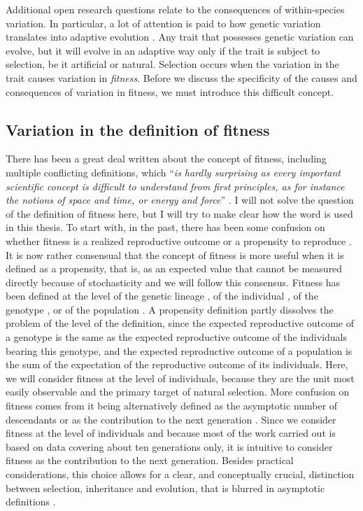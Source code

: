 Additional open research questions relate to the consequences of within-species variation. In particular, a lot of attention is paid to how genetic variation translates into adaptive evolution \parencite{Brookfield2016}.
Any trait that possesses genetic variation can evolve, but it will evolve in an adaptive way only if the trait is subject to selection, be it artificial or natural. Selection occurs when the variation in the trait causes variation in \emph{fitness}. Before we discuss the specificity of the causes and consequences of variation in fitness, we must introduce this difficult concept.

\subsection{Variation in the definition of fitness}
There has been a great deal written about the concept of fitness, including multiple conflicting definitions, which ``\emph{is hardly surprising as every important scientific concept is difficult to understand from first principles, as for instance the notions of space and time, or energy and force}'' \parencite[p. 1358][]{Wagner2010}. I will not solve the question of the definition of fitness here, but I will try to make clear how the word is used in this thesis. To start with, in the past, there has been some confusion on whether fitness is a realized reproductive outcome or a propensity to reproduce \parencite{Brandon1984}. It is now rather consensual that the concept of fitness is more useful when it is defined as a propensity, that is, as an expected value that cannot be measured directly because of stochasticity \parencite{Brandon1984,Price1996,Krimbas2004} and we will follow this consensus. Fitness has been defined at the level of the genetic lineage \parencite[e.g.][]{Akc2016}, of the individual \parencite[e.g.][]{Cam2000}, of the genotype \parencite[e.g.][]{Steiner2012}, or of the population \parencite[e.g.][]{vanTienderen2000}. A propensity definition partly dissolves the problem of the level of the definition, since the expected reproductive outcome of a genotype is the same as the expected reproductive outcome of the individuals bearing this genotype, and the expected reproductive outcome of a population is the sum of the expectation of the reproductive outcome of its individuals. Here, we will consider fitness at the level of individuals, because they are the unit most easily observable and the primary target of natural selection.
More confusion on fitness comes from it being alternatively defined as the asymptotic number of descendants or as the contribution to the next generation \parencite{Wade2006}. Since we consider fitness at the level of individuals and because most of the work carried out is based on data covering about ten generations only, it is intuitive to consider fitness as the contribution to the next generation. Besides practical considerations, this choice allows for a clear, and conceptually crucial, distinction between selection, inheritance and evolution, that is blurred in asymptotic definitions \parencite{Fisher1930, Arnold1984}. 
